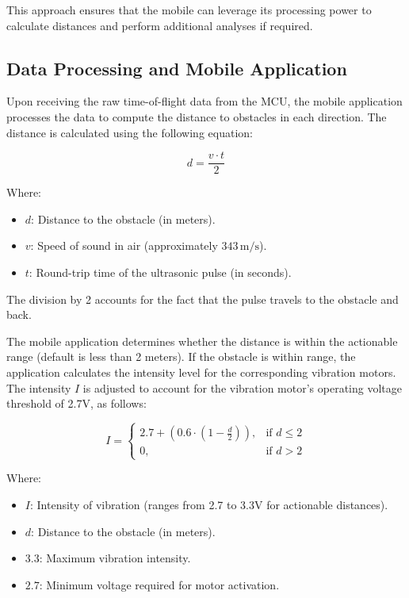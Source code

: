 This approach ensures that the mobile can leverage its processing power to calculate distances and perform additional analyses if required.

\subsection{Data Processing and Mobile Application}

Upon receiving the raw time-of-flight data from the MCU, the mobile application processes the data to compute the distance to obstacles in each direction. The distance is calculated using the following equation:

\[
d = \frac{v \cdot t}{2}
\]

Where:
\begin{itemize}
	\item \(d\): Distance to the obstacle (in meters).
	\item \(v\): Speed of sound in air (approximately \(343 \, \text{m/s}\)).
	\item \(t\): Round-trip time of the ultrasonic pulse (in seconds).
\end{itemize}

The division by 2 accounts for the fact that the pulse travels to the obstacle and back.

The mobile application determines whether the distance is within the actionable range (default is less than 2 meters). If the obstacle is within range, the application calculates the intensity level for the corresponding vibration motors. The intensity \(I\) is adjusted to account for the vibration motor's operating voltage threshold of 2.7V, as follows:

\[
I = 
\begin{cases} 
	2.7 + (0.6 \cdot (1 - \frac{d}{2})), & \text{if } d \leq 2 \\ 
	0, & \text{if } d > 2
\end{cases}
\]

Where:
\begin{itemize}
	\item \(I\): Intensity of vibration (ranges from 2.7 to 3.3V for actionable distances).
	\item \(d\): Distance to the obstacle (in meters).
	\item \(3.3\): Maximum vibration intensity.
	\item \(2.7\): Minimum voltage required for motor activation.
\end{itemize}

